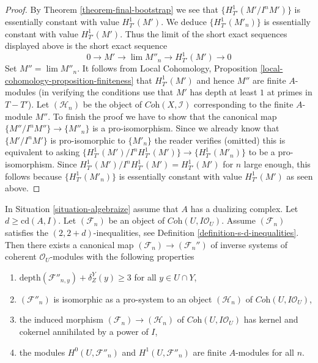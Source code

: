 \begin{proof}
\medskip\noindent
By Theorem \ref{theorem-final-bootstrap} we see that $\{H^1_{T'}(M'/I^nM')\}$
is essentially constant with value $H^1_{T'}(M')$. We deduce
$\{H^1_{T'}(M'_n)\}$ is essentially constant with value $H^1_{T'}(M')$.
Thus the limit of the short exact sequences displayed above
is the short exact sequence
$$
0 \to M' \to \lim M''_n \to H^1_{T'}(M') \to 0
$$
Set $M'' = \lim M''_n$. It follows from
Local Cohomology, Proposition \ref{local-cohomology-proposition-finiteness}
that $H^1_{T'}(M')$ and hence $M''$ are finite $A$-modules (in verifying the
conditions use that $M'$ has depth at least $1$ at primes in $T - T'$).
Let $(\mathcal{H}_n)$ be the object of $\textit{Coh}(X, \mathcal{I})$
corresponding to the finite $A$-module $M''$. To finish the proof we have
to show that the canonical map $\{M''/I^nM''\} \to \{M''_n\}$ is a
pro-isomorphism. Since we already know that $\{M'/I^nM'\}$ is pro-isomorphic
to $\{M'_n\}$ the reader verifies (omitted) this is equivalent to asking
$\{H^1_{T'}(M')/I^nH^1_{T'}(M')\} \to \{H^1_{T'}(M'_n)\}$
to be a pro-isomorphism. Since $H^1_{T'}(M')/I^nH^1_{T'}(M') = H^1_{T'}(M')$
for $n$ large enough, this follows because $\{H^1_{T'}(M'_n)\}$
is essentially constant with value $H^1_{T'}(M')$ as seen above.
\end{proof}

\begin{lemma}
\label{lemma-improvement-application}
In Situation \ref{situation-algebraize} assume that $A$ has
a dualizing complex. Let $d \geq \text{cd}(A, I)$. Let $(\mathcal{F}_n)$
be an object of $\textit{Coh}(U, I\mathcal{O}_U)$. Assume
$(\mathcal{F}_n)$ satisfies the $(2, 2 + d)$-inequalities, see
Definition \ref{definition-s-d-inequalities}.
Then there exists a canonical map $(\mathcal{F}_n) \to (\mathcal{F}_n'')$
of inverse systems of coherent $\mathcal{O}_U$-modules
with the following properties
\begin{enumerate}
\item $\text{depth}(\mathcal{F}''_{n, y}) + \delta^Y_Z(y) \geq 3$
for all $y \in U \cap Y$,
\item $(\mathcal{F}''_n)$ is isomorphic as a pro-system to an object
$(\mathcal{H}_n)$ of $\textit{Coh}(U, I\mathcal{O}_U)$,
\item the induced morphism $(\mathcal{F}_n) \to (\mathcal{H}_n)$ of
$\textit{Coh}(U, I\mathcal{O}_U)$ has kernel and cokernel
annihilated by a power of $I$,
\item the modules $H^0(U, \mathcal{F}''_n)$ and $H^1(U, \mathcal{F}''_n)$
are finite $A$-modules for all $n$.
\end{enumerate}
\end{lemma}

